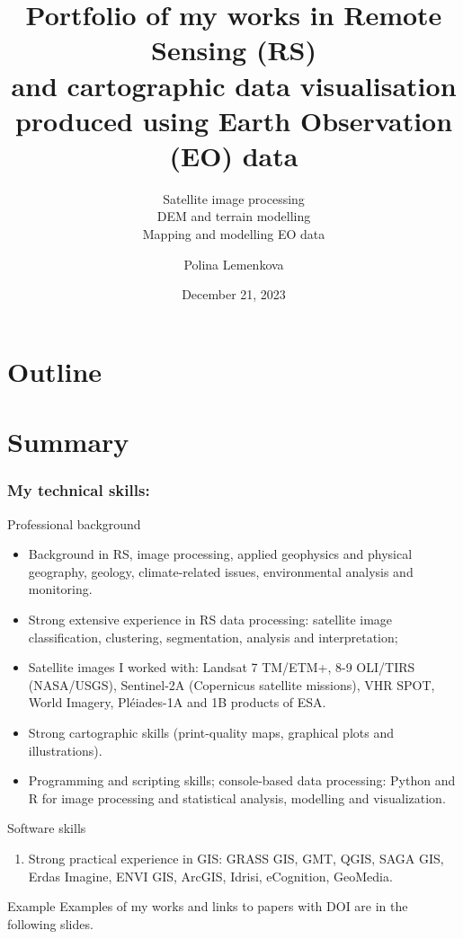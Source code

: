 \documentclass[pdflatex,compress,8pt,
	xcolor={dvipsnames,dvipsnames,svgnames,x11names,table},
	hyperref={colorlinks = true,breaklinks = true, urlcolor = NavyBlue, breaklinks = true}]{beamer}
\title[Portfolio of my works in Remote Sensing (RS)]
{Portfolio of my works in Remote Sensing (RS) \\ and cartographic data visualisation \\produced using Earth Observation (EO) data}
\subtitle{\vspace*{0.5cm}Satellite image processing \\
DEM and terrain modelling \\ Mapping and modelling EO data
}
\author{Polina Lemenkova}
\date{December 21, 2023}
\begin{document}
\begin{frame}
           \titlepage
\end{frame}

\section*{Outline}
\begin{frame}
           \tableofcontents
\end{frame}

\section{Summary}

\begin{frame}\frametitle{My technical skills:}

\begin{alertblock}{Professional background}
\begin{itemize}
	\item Background in RS, image processing, applied geophysics and physical geography, geology, climate-related issues, environmental analysis and monitoring.
	\item Strong extensive experience in RS data processing: satellite image classification, clustering, segmentation, analysis and interpretation; 
	\item Satellite images I worked with: Landsat 7 TM/ETM+, 8-9 OLI/TIRS (NASA/USGS), Sentinel-2A (Copernicus satellite missions), VHR SPOT, World Imagery, Pléiades-1A and 1B products of ESA. 
	\item Strong cartographic skills (print-quality maps, graphical plots and illustrations).
	\item Programming and scripting skills; console-based data processing: Python and R for image processing and statistical analysis, modelling and visualization.
\end{itemize}
\end{alertblock}

\begin{block}{Software skills}
\begin{enumerate}[\ding{52}]
	\item Strong practical experience in GIS: GRASS GIS, GMT, QGIS, SAGA GIS, 
Erdas Imagine, ENVI GIS, ArcGIS, Idrisi, eCognition, GeoMedia.
\end{enumerate}
\end{block}

\begin{block}{Example}
Examples of my works and links to papers with DOI are in the following slides.
\end{block}
\end{frame}
\end{document}
